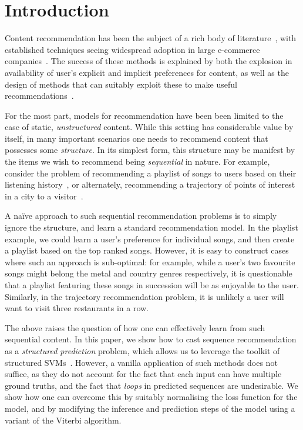 
\section{Introduction}
\label{sec:intro}

Content recommendation has been the subject of a rich body of literature~\citep{Goldberg:1992,Resnick:1994,Konstan:1997,Sarwar:2001,Koren:2010},
with established techniques seeing widespread adoption in large e-commerce companies~\citep{Linden:2003,Agarwal:2013,Amatriain:2015,Gomez-Uribe:2015}.
The success of these methods is explained by both the explosion in availability of user's explicit and implicit preferences for content,
as well as the design of methods that can suitably exploit these to make useful recommendations~\citep{Koren:2009}.

For the most part, models for recommendation have been been limited to the case of static, \emph{unstructured} content.
While this setting has considerable value by itself,
in many important scenarios one needs to recommend content that possesses some \emph{structure}.
In its simplest form, this structure may be manifest by the items we wish to recommend being \emph{sequential} in nature.
For example, consider the problem of recommending a playlist of songs to users based on their listening history~\citep{McFee:2011,chen2012playlist},
or alternately,
recommending a trajectory of points of interest in a city to a visitor~\citep{lu2010photo2trip,lu2012personalized,ijcai15,cikm16paper}.

A na\"{i}ve approach to such sequential recommendation problems is to simply ignore the structure,
and learn a standard recommendation model.
In the playlist example, we could learn a user's preference for individual songs,
and then create a playlist based on the top ranked songs.
However, it is easy to construct cases where such an approach is sub-optimal:
for example, while a user's two favourite songs might belong
the metal and country genres respectively,
it is questionable that a playlist featuring these songs in succession will be as enjoyable to the user.
Similarly, in the trajectory recommendation problem, it is unlikely a user will want to visit three restaurants in a row.

The above raises the question of how one can effectively learn from such sequential content.
In this paper, we show how to cast sequence recommendation as a \emph{structured prediction} problem,
which allows us to leverage the toolkit of structured SVMs~\citep{tsochantaridis2005large}.
However, a vanilla application of such methods does not suffice,
as they do not account for the fact that each input can have multiple ground truths,
and the fact that \emph{loops} in predicted sequences are undesirable.
We show how one can overcome this by
suitably normalising the loss function for the model,
and by modifying the inference and prediction steps of the model using a variant of the Viterbi algorithm.

